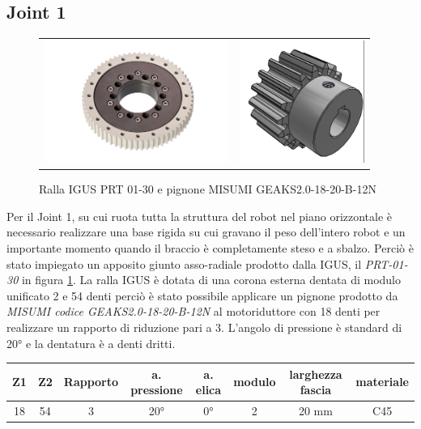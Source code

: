 \documentclass[%
corpo=11pt,
twoside,
 stile=classica,
oldstyle,
greek,%
]{toptesi}
\begin{document}
		\subsection{Joint 1}
		\begin{figure}
			\centering
			\begin{tabular}{ll}
				\includegraphics[height=4cm,keepaspectratio]{pictures/ralla.jpg}
				&
				\includegraphics[height=4cm,keepaspectratio]{pictures/pignone.png}
			\end{tabular}
			\caption{Ralla IGUS PRT 01-30 e pignone MISUMI GEAKS2.0-18-20-B-12N}
			\label{fig:RALLA}
		\end{figure}
		Per il Joint 1, su cui ruota tutta la struttura del robot nel piano orizzontale è necessario realizzare una base rigida su cui gravano il peso dell'intero robot e un importante momento quando il braccio è completamente steso e a sbalzo. Perciò è stato impiegato un apposito giunto asso-radiale prodotto dalla IGUS, il \textit{PRT-01-30} in figura \ref{fig:RALLA}. 
		La ralla IGUS è dotata di una corona esterna dentata di modulo unificato 2 e 54 denti perciò è stato possibile applicare un pignone prodotto da \textit{MISUMI codice GEAKS2.0-18-20-B-12N} al motoriduttore con 18 denti per realizzare un rapporto di riduzione pari a 3. L'angolo di pressione è standard di 20° e la dentatura è a denti dritti. 
		
		\begin{tabular}{|c|c|c|c|c|c|c|c|}
			
			\hline
			Z1 & Z2 & Rapporto & a. pressione & a. elica & modulo & larghezza fascia & materiale \\
			\hline
			18 & 54 & 3 & 20° & 0°  & 2 & 20 mm & C45  \\
			\hline
			
		\end{tabular}
		
\end{document}
